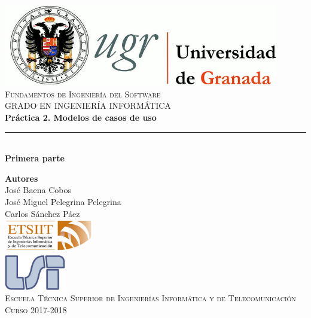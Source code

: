 \documentclass[12pt,spanish]{article}
\begin{document}
\begin{titlepage}

\newlength{\centeroffset}
\setlength{\centeroffset}{-0.5\oddsidemargin}
\addtolength{\centeroffset}{0.5\evensidemargin}
\thispagestyle{empty}

\noindent\hspace*{\centeroffset}\begin{minipage}{\textwidth}

\centering
\includegraphics[width=0.9\textwidth]{logo_ugr.jpg}\\[1.4cm]

\textsc{ \Large Fundamentos de Ingeniería del Software\\[0.2cm]}
\textsc{GRADO EN INGENIERÍA INFORMÁTICA}\\[1cm]

{\Huge\bfseries Práctica 2. Modelos de casos de uso\\
}
\noindent\rule[-1ex]{\textwidth}{3pt}\\[3.5ex]
{\large\bfseries Primera parte}
\end{minipage}

\vspace{2.5cm}
\noindent\hspace*{\centeroffset}
\begin{minipage}{\textwidth}
\centering

\textbf{Autores}\\ {José Baena Cobos \\ José Miguel Pelegrina Pelegrina\\Carlos Sánchez Páez}\\[2.5ex]
\includegraphics[width=0.3\textwidth]{etsiit_logo.png}\\[0.1cm]
\vspace{1.5cm}
\includegraphics[width=0.2\textwidth]{lsi.png}\\[0.1cm]
\vspace{1cm}
\textsc{Escuela Técnica Superior de Ingenierías Informática y de Telecomunicación}\\
\vspace{1cm}
\textsc{Curso 2017-2018}
\end{minipage}
\end{titlepage}
\tableofcontents
\thispagestyle{empty}
\listoffigures
\listoftables
\newpage
\setcounter{page}{1}
\end{document}

